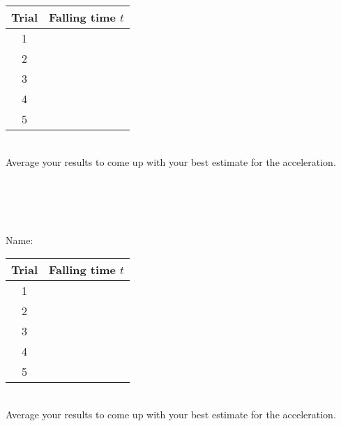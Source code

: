 \documentclass[12pt]{article}
\begin{document}
\begin{center}
\begin{tabular}{|| c | c ||}
\hline Trial & Falling time $t$ \\
\hline
1 & \\
2 & \\
3 & \\
4 & \\
5 & \\
\hline
\end{tabular}
\end{center}

\hspace{2mm}\\

Average your results to come up with your best estimate for the
acceleration. 

\hspace{2mm}\\
\hspace{2mm}\\
\hspace{2mm}\\
\hspace{2mm}\\

Name:\\


\begin{center}
\begin{tabular}{|| c | c ||}
\hline Trial & Falling time $t$ \\
\hline
1 & \\
2 & \\
3 & \\
4 & \\
5 & \\
\hline
\end{tabular}
\end{center}

\hspace{2mm}\\

Average your results to come up with your best estimate for the
acceleration. 
\end{document}
